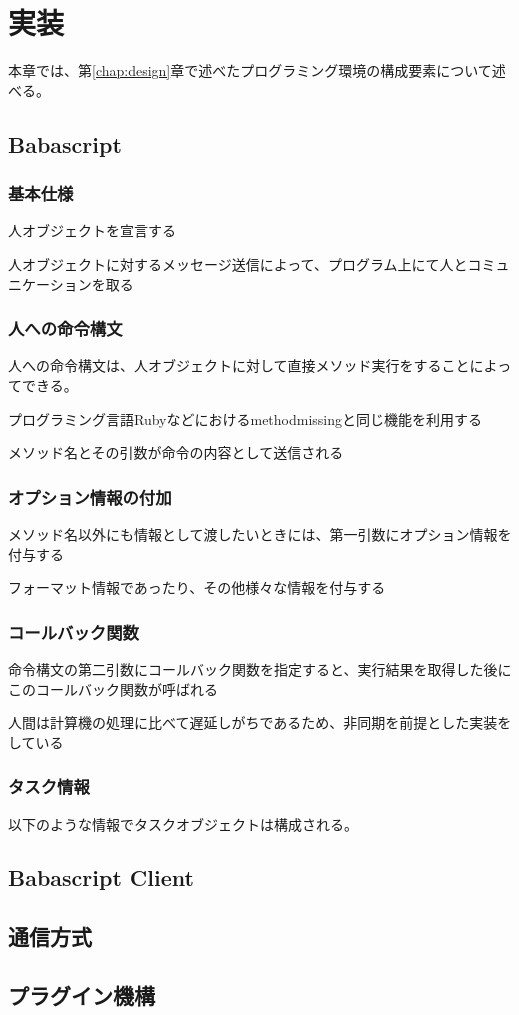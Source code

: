 \chapter{実装}
\label{chap:implementation}

本章では、第\ref{chap:design}章で述べたプログラミング環境の構成要素について述べる。

\section{Babascript}

\subsection{基本仕様}
人オブジェクトを宣言する

人オブジェクトに対するメッセージ送信によって、プログラム上にて人とコミュニケーションを取る

\subsection{人への命令構文}
人への命令構文は、人オブジェクトに対して直接メソッド実行をすることによってできる。

プログラミング言語Rubyなどにおけるmethodmissingと同じ機能を利用する

メソッド名とその引数が命令の内容として送信される

\subsection{オプション情報の付加}

メソッド名以外にも情報として渡したいときには、第一引数にオプション情報を付与する

フォーマット情報であったり、その他様々な情報を付与する

\subsection{コールバック関数}

命令構文の第二引数にコールバック関数を指定すると、実行結果を取得した後にこのコールバック関数が呼ばれる

人間は計算機の処理に比べて遅延しがちであるため、非同期を前提とした実装をしている

\subsection{タスク情報}

以下のような情報でタスクオブジェクトは構成される。

\section{Babascript Client}

\section{通信方式}

\section{プラグイン機構}
